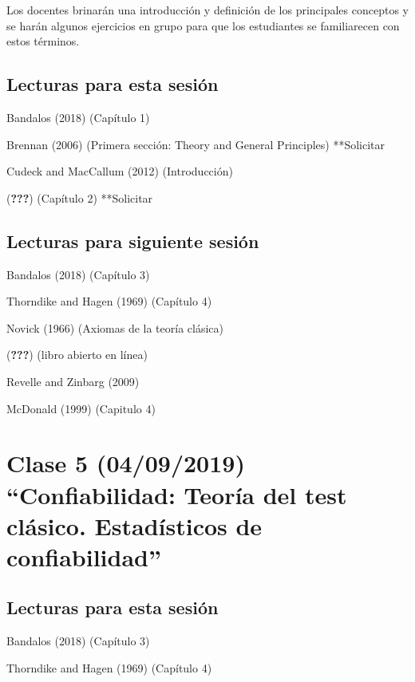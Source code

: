 \documentclass[11pt,]{article}
\begin{document}
Los docentes brinarán una introducción y definición de los principales
conceptos y se harán algunos ejercicios en grupo para que los
estudiantes se familiarecen con estos términos.

\hypertarget{lecturas-para-esta-sesion-2}{%
\subsection{Lecturas para esta
sesión}\label{lecturas-para-esta-sesion-2}}

Bandalos (2018) (Capítulo 1)

Brennan (2006) (Primera sección: Theory and General Principles)
**Solicitar

Cudeck and MacCallum (2012) (Introducción)

({\textbf{???}}) (Capítulo 2) **Solicitar

\hypertarget{lecturas-para-siguiente-sesion-2}{%
\subsection{Lecturas para siguiente
sesión}\label{lecturas-para-siguiente-sesion-2}}

Bandalos (2018) (Capítulo 3)

Thorndike and Hagen (1969) (Capítulo 4)

Novick (1966) (Axiomas de la teoría clásica)

({\textbf{???}}) (libro abierto en línea)

Revelle and Zinbarg (2009)

McDonald (1999) (Capitulo 4)

\hypertarget{clase-5-04092019-confiabilidad-teoria-del-test-clasico.-estadisticos-de-confiabilidad}{%
\section{Clase 5 (04/09/2019) ``Confiabilidad: Teoría del test clásico.
Estadísticos de
confiabilidad''}\label{clase-5-04092019-confiabilidad-teoria-del-test-clasico.-estadisticos-de-confiabilidad}}

\hypertarget{lecturas-para-esta-sesion-3}{%
\subsection{Lecturas para esta
sesión}\label{lecturas-para-esta-sesion-3}}

Bandalos (2018) (Capítulo 3)

Thorndike and Hagen (1969) (Capítulo 4)
\end{document}
